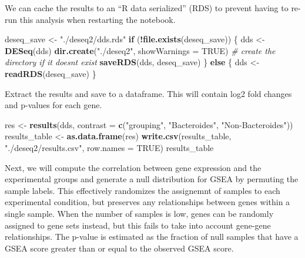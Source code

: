 \documentclass[
]{book}
\newenvironment{Shaded}{\begin{snugshade}}{\end{snugshade}}
\newcommand{\AttributeTok}[1]{\textcolor[rgb]{0.13,0.29,0.53}{#1}}
\newcommand{\CommentTok}[1]{\textcolor[rgb]{0.56,0.35,0.01}{\textit{#1}}}
\newcommand{\ConstantTok}[1]{\textcolor[rgb]{0.56,0.35,0.01}{#1}}
\newcommand{\ControlFlowTok}[1]{\textcolor[rgb]{0.13,0.29,0.53}{\textbf{#1}}}
\newcommand{\FunctionTok}[1]{\textcolor[rgb]{0.13,0.29,0.53}{\textbf{#1}}}
\newcommand{\NormalTok}[1]{#1}
\newcommand{\OtherTok}[1]{\textcolor[rgb]{0.56,0.35,0.01}{#1}}
\newcommand{\SpecialCharTok}[1]{\textcolor[rgb]{0.81,0.36,0.00}{\textbf{#1}}}
\newcommand{\StringTok}[1]{\textcolor[rgb]{0.31,0.60,0.02}{#1}}
\begin{document}
We can cache the results to an ``R data serialized'' (RDS) to prevent having to re-run this analysis when restarting the notebook.

\begin{Shaded}
\begin{Highlighting}[numbers=left,,]
\NormalTok{deseq\_save }\OtherTok{\textless{}{-}} \StringTok{"./deseq2/dds.rds"}
\ControlFlowTok{if}\NormalTok{ (}\SpecialCharTok{!}\FunctionTok{file.exists}\NormalTok{(deseq\_save)) \{}
\NormalTok{  dds }\OtherTok{\textless{}{-}} \FunctionTok{DESeq}\NormalTok{(dds)}
  \FunctionTok{dir.create}\NormalTok{(}\StringTok{"./deseq2"}\NormalTok{, }\AttributeTok{showWarnings =} \ConstantTok{TRUE}\NormalTok{) }\CommentTok{\# create the directory if it doesn\textquotesingle{}t exist}
  \FunctionTok{saveRDS}\NormalTok{(dds, deseq\_save)}
\NormalTok{\} }\ControlFlowTok{else}\NormalTok{ \{}
\NormalTok{  dds }\OtherTok{\textless{}{-}} \FunctionTok{readRDS}\NormalTok{(deseq\_save)}
\NormalTok{\}}
\end{Highlighting}
\end{Shaded}

Extract the results and save to a dataframe. This will contain log2 fold changes and p-values for each gene.

\begin{Shaded}
\begin{Highlighting}[numbers=left,,]
\NormalTok{res }\OtherTok{\textless{}{-}} \FunctionTok{results}\NormalTok{(dds, }\AttributeTok{contrast =} \FunctionTok{c}\NormalTok{(}\StringTok{"grouping"}\NormalTok{, }\StringTok{"Bacteroides"}\NormalTok{, }\StringTok{"Non{-}Bacteroides"}\NormalTok{))}
\NormalTok{results\_table }\OtherTok{\textless{}{-}} \FunctionTok{as.data.frame}\NormalTok{(res)}
\FunctionTok{write.csv}\NormalTok{(results\_table, }\StringTok{"./deseq2/results.csv"}\NormalTok{, }\AttributeTok{row.names =} \ConstantTok{TRUE}\NormalTok{)}
\NormalTok{results\_table}
\end{Highlighting}
\end{Shaded}

Next, we will compute the correlation between gene expression and the experimental groups and generate a null distribution for GSEA
by permuting the sample labels. This effectively randomizes the assignemnt of samples
to each experimental condition, but preserves any relationships between genes within a single sample.
When the number of samples is low, genes can be randomly assigned to gene sets instead, but this fails to take into account gene-gene relationships.
The p-value is estimated as the fraction of null samples that have a GSEA score greater than or equal to the observed GSEA score.
\end{document}
